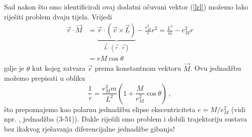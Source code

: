 Sad nakon što smo identificirali ovaj
dodatni očuvani vektor (\ref{lrl}) možemo lako riješiti problem
dvaju tijela. Vrijedi
\begin{equation}
\begin{split}
 \vec{r}\cdot\vec{M} &= \underbrace{\vec{r}\cdot(\vec{v}\times\vec{L})}_{
\vec{L}\cdot(\vec{r}\cdot\vec{v})} - \frac{e_{M}^2}{r} r^2
= \frac{L^2}{m} - e_{M}^2 r \\
&= r M \cos \theta
\end{split}
\end{equation}
gdje je $\theta$ kut kojeg zatvara $\vec{r}$ prema konstantnom vektoru
$\vec{M}$. Ovu jednadžbu možemo prepisati u obliku
\begin{equation}
\frac{1}{r} = \frac{e_{M}^2 m}{L^2} \left(1+\frac{M}{e_{M}^2} \cos\theta\right) \,,
\end{equation}
što prepoznajemo kao polarnu jednadžbu elipse ekscentriciteta $e=M/e_{M}^2$
(vidi npr. \cite{Goldstein:1980}, jednadžba (3-51)). Dakle riješili smo problem i
dobili trajektoriju sustava bez ikakvog rješavanja diferencijalne
jednadžbe gibanja!


